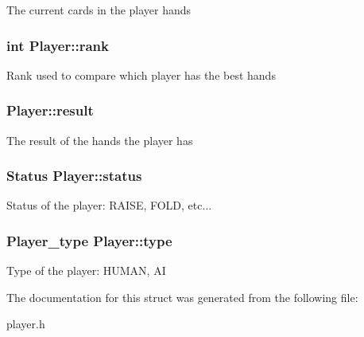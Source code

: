 The current cards in the player hands \hypertarget{structPlayer_a307c222c67b1318ec1d7dc9095c50a98}{
\subsubsection[{rank}]{\setlength{\rightskip}{0pt plus 5cm}int Player\+::rank}}\label{structPlayer_a307c222c67b1318ec1d7dc9095c50a98}
Rank used to compare which player has the best hands \hypertarget{structPlayer_a6c2e05abd5b83faf72239511f992af36}{
\subsubsection[{result}]{ Player\+::result}}\label{structPlayer_a6c2e05abd5b83faf72239511f992af36}
The result of the hands the player has \hypertarget{structPlayer_aeb08943a32834515e66222d2e948292d}{
\subsubsection[{status}]{\setlength{\rightskip}{0pt plus 5cm}Status Player\+::status}}\label{structPlayer_aeb08943a32834515e66222d2e948292d}
Status of the player\+: R\+A\+I\+S\+E, F\+O\+L\+D, etc... \hypertarget{structPlayer_a89a4fdb70177957727ae3816b962ca2f}{
\subsubsection[{type}]{\setlength{\rightskip}{0pt plus 5cm}Player\+\_\+type Player\+::type}}\label{structPlayer_a89a4fdb70177957727ae3816b962ca2f}
Type of the player\+: H\+U\+M\+A\+N, A\+I 

The documentation for this struct was generated from the following file\+:\begin{DoxyCompactItemize}
\item 
player.\+h\end{DoxyCompactItemize}
